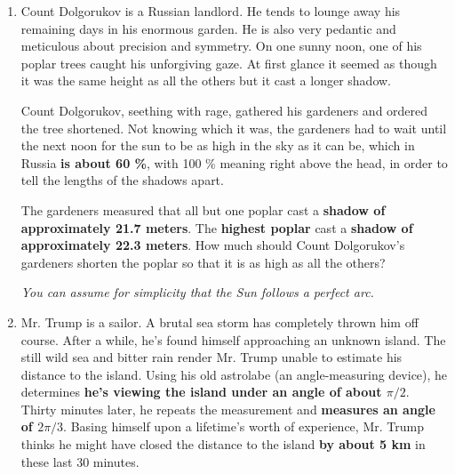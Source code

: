 \documentclass[a4paper,11pt]{article}
\begin{document}
\begin{enumerate}
 \item Count Dolgorukov is a Russian landlord. He tends to lounge away his
  remaining days in his enormous garden. He is also very pedantic and meticulous
  about precision and symmetry. On one sunny noon, one of his poplar trees
  caught his unforgiving gaze. At first glance it seemed as though it was the
  same height as all the others but it cast a longer shadow.

  Count Dolgorukov, seething with rage, gathered his gardeners and ordered the
  tree shortened. Not knowing which it was, the gardeners had to wait until the
  next noon for the sun to be as high in the sky as it can be, which in Russia
  \textbf{is about 60 \%}, with 100 \% meaning right above the head, in order to
  tell the lengths of the shadows apart.
 
  The gardeners measured that all but one poplar cast a \textbf{shadow of
  approximately 21.7 meters}. The \textbf{highest poplar} cast a \textbf{shadow
  of approximately 22.3 meters}. How much should Count Dolgorukov's gardeners
  shorten the poplar so that it is as high as all the others?
 
  \emph{You can assume for simplicity that the Sun follows a perfect arc.}
 
  \begin{center}
  \end{center}
 \item Mr. Trump is a sailor. A brutal sea storm has completely thrown him off
  course. After a while, he's found himself approaching an unknown island. The
  still wild sea and bitter rain render Mr. Trump unable to estimate his
  distance to the island. Using his old astrolabe (an angle-measuring device),
  he determines \textbf{he's viewing the island under an angle of about $\pi /
  2$}. Thirty minutes later, he repeats the measurement and \textbf{measures an
  angle of $2\pi / 3$}. Basing himself upon a lifetime's worth of experience,
  Mr. Trump thinks he might have closed the distance to the island \textbf{by
  about 5 km} in these last 30 minutes.
  

\end{enumerate}
\end{document}
